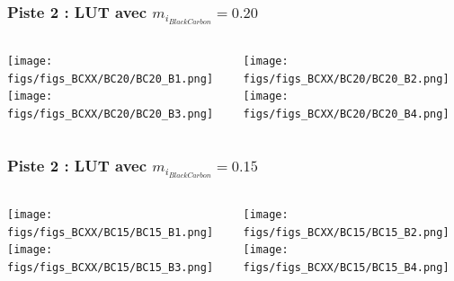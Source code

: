 \documentclass[8pt]{beamer}
\begin{document}
\begin{frame}
\frametitle{Piste 2 : LUT avec $m_{i_{Black Carbon}} = 0.20$}
	\begin{columns}
		\begin{column}{0.5\textwidth}
			\begin{center}
	     		\texttt{[image: figs/figs\_BCXX/BC20/BC20\_B1.png]}	
		     	\texttt{[image: figs/figs\_BCXX/BC20/BC20\_B3.png]}
		    \end{center}		
		    
		\end{column}
		\begin{column}{0.5\textwidth}
			\begin{center}
		     	\texttt{[image: figs/figs\_BCXX/BC20/BC20\_B2.png]}
		     	\texttt{[image: figs/figs\_BCXX/BC20/BC20\_B4.png]}
		    \end{center}				
		\end{column}
	\end{columns}
\end{frame}

\begin{frame}
\frametitle{Piste 2 : LUT avec $m_{i_{Black Carbon}} = 0.15$}
	\begin{columns}
		\begin{column}{0.5\textwidth}
			\begin{center}
	     		\texttt{[image: figs/figs\_BCXX/BC15/BC15\_B1.png]}	
		     	\texttt{[image: figs/figs\_BCXX/BC15/BC15\_B3.png]}
		    \end{center}		
		    
		\end{column}
		\begin{column}{0.5\textwidth}
			\begin{center}
		     	\texttt{[image: figs/figs\_BCXX/BC15/BC15\_B2.png]}
		     	\texttt{[image: figs/figs\_BCXX/BC15/BC15\_B4.png]}
		    \end{center}				
		\end{column}
	\end{columns}
\end{frame}
\end{document}
